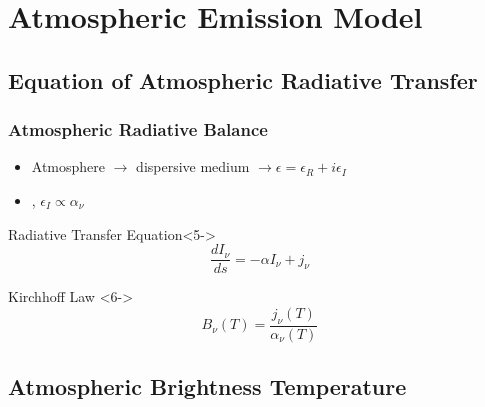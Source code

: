 \documentclass[10pt,aspectratio=169]{beamer}
\begin{document}
\section{Atmospheric Emission Model}
\subsection{Equation of Atmospheric Radiative Transfer}

\begin{frame}
\frametitle{Atmospheric Radiative Balance}

\begin{itemize}
\item<1-> Atmosphere $\rightarrow$ \alert{dispersive} medium $\rightarrow \epsilon = \epsilon_R + i\epsilon_I$
\item<2-> ,
          \quad $\epsilon_I \propto \alpha_\nu$ 
\end{itemize}


\begin{block}{Radiative Transfer Equation}<5->
\begin{equation}
\frac{dI_\nu}{ds} = -\alpha I_\nu + j_\nu
\end{equation}
\end{block}

\begin{block}{Kirchhoff Law }<6->
\begin{equation}
B_\nu(T) = \frac{j_\nu(T)}{\alpha_\nu(T)}
\end{equation}
\end{block}

\end{frame}

\subsection{Atmospheric Brightness Temperature}
\end{document}
